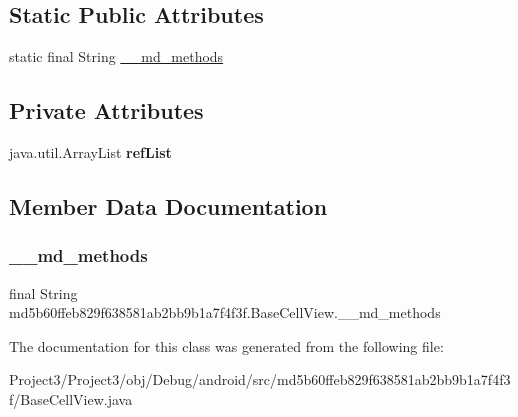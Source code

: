 \subsection*{Static Public Attributes}
\begin{DoxyCompactItemize}
\item 
static final String \hyperlink{classmd5b60ffeb829f638581ab2bb9b1a7f4f3f_1_1BaseCellView_ab45ff8d3fd40dd0e56aafff804b441ea}{\+\_\+\+\_\+md\+\_\+methods}
\end{DoxyCompactItemize}
\subsection*{Private Attributes}
\begin{DoxyCompactItemize}
\item 
\mbox{\label{classmd5b60ffeb829f638581ab2bb9b1a7f4f3f_1_1BaseCellView_ada428ae06aa11eb73b64b1723a81985b}} 
java.\+util.\+Array\+List {\bfseries ref\+List}
\end{DoxyCompactItemize}


\subsection{Member Data Documentation}
\mbox{\label{classmd5b60ffeb829f638581ab2bb9b1a7f4f3f_1_1BaseCellView_ab45ff8d3fd40dd0e56aafff804b441ea}} 
\subsubsection{\texorpdfstring{\+\_\+\+\_\+md\+\_\+methods}{\_\_md\_methods}}
{\footnotesize\ttfamily final String md5b60ffeb829f638581ab2bb9b1a7f4f3f.\+Base\+Cell\+View.\+\_\+\+\_\+md\+\_\+methods\hspace{0.3cm}{\ttfamily [static]}}



The documentation for this class was generated from the following file\+:\begin{DoxyCompactItemize}
\item 
Project3/\+Project3/obj/\+Debug/android/src/md5b60ffeb829f638581ab2bb9b1a7f4f3f/Base\+Cell\+View.\+java\end{DoxyCompactItemize}
